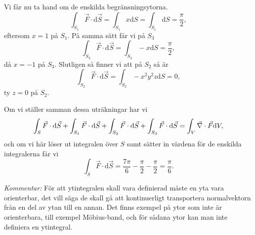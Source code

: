 \documentclass[%
oneside,                 %
final,                   %
10pt]{article}
\newenvironment{notice_mdfboxadmon}[1][]{
\begin{notice_mdfboxmdframed}[frametitle=#1]
}
{
\end{notice_mdfboxmdframed}
}
\begin{document}
\begin{notice_mdfboxadmon}
Vi får nu ta hand om de enskilda begränsningsytorna.
\begin{equation}
\int_{S_1} \vec{F} \cdot \mbox{d}\vec{S} = \int_{S_1} x\mbox{d}S = 
\int_{S_1} \mbox{d}S =
\frac{\pi}{2},
\end{equation}
eftersom $x = 1$ på $S_1$.  På samma sätt får vi på $S_3$
\begin{equation}
  \int_{S_3} \vec{F} \cdot \mbox{d}\vec{S} = \int_{S_3} -x \mbox{d}S = \frac{\pi}{2},
\end{equation}
då $x = -1$ på $S_3$. Slutligen så finner vi att på $S_2$ så är
\begin{equation}
  \int_{S_2} \vec{F} \cdot \mbox{d}\vec{S} = \int_{S_2} -x^2y^2z \mbox{d}S = 0,
\end{equation}
ty $z = 0$ på $S_2$.

Om vi ställer samman dessa uträkningar har vi
\begin{equation}
  \int_S \vec{F} \cdot \mbox{d}\vec{S} + \int_{S_1} \vec{F} \cdot \mbox{d}\vec{S} + 
\int_{S_2} \vec{F} \cdot \mbox{d}\vec{S} + \int_{S_3} \vec{F} \cdot \mbox{d}\vec{S} =
\int_V \vec{\nabla} \cdot \vec{F} \mbox{d}V,
\end{equation}
och om vi här löser ut integralen över $S$ samt sätter in värdena för de enskilda integralerna får vi
\begin{equation}
  \int_S \vec{F} \cdot \mbox{d}\vec{S} = \frac{7\pi}{6} - \frac{\pi}{2} -
\frac{\pi}{2} = \frac{\pi}{6}.
\end{equation}

\emph{Kommentar:}  
För att ytintegralen skall vara definierad måste en yta vara orienterbar, det vill säga de skall gå att kontinuerligt transportera normalvektorn från en del av ytan till en annan.  Det finns exempel på ytor som inte är orienterbara, till exempel Möbius-band, och för sådana ytor kan man inte definiera en ytintegral.
\end{notice_mdfboxadmon} %
\end{document}
